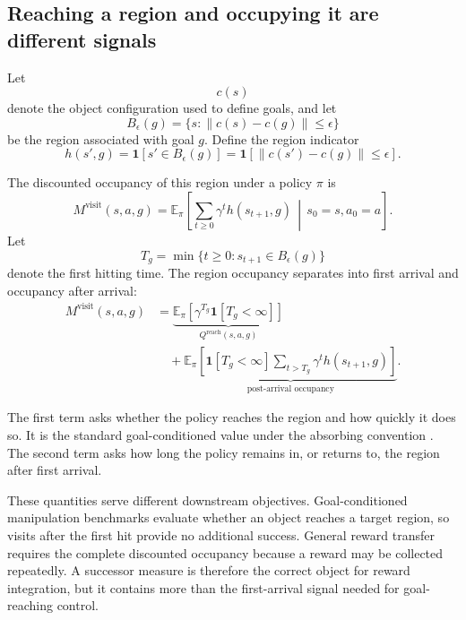 \documentclass{article}
\newcommand{\E}{\mathbb{E}}
\newcommand{\ind}[1]{\mathbf{1}\!\left[#1\right]}
\newcommand{\cube}{c}
\newcommand{\Reach}{\mathrm{reach}}
\newcommand{\Visit}{\mathrm{visit}}
\begin{document}
\subsection{Reaching a region and occupying it are different signals}
\label{sec:reach-vs-visit}

Let
\begin{equation}
\cube(s)
\end{equation}
denote the object configuration used to define goals, and let
\begin{equation}
B_\epsilon(g)=\{s:\|\cube(s)-\cube(g)\|\le\epsilon\}
\label{eq:goal-region}
\end{equation}
be the region associated with goal $g$.
Define the region indicator
\begin{equation}
h(s',g)=\ind{s'\in B_\epsilon(g)}=\ind{\|\cube(s')-\cube(g)\|\le\epsilon}.
\label{eq:hit}
\end{equation}

The discounted occupancy of this region under a policy $\pi$ is
\begin{equation}
M^{\Visit}(s,a,g)
=
\E_\pi\!\left[
\sum_{t\ge0}\gamma^t h(s_{t+1},g)
\,\middle|\,
s_0=s,a_0=a
\right].
\label{eq:region-occupancy}
\end{equation}
Let
\begin{equation}
T_g=\min\{t\ge0:s_{t+1}\in B_\epsilon(g)\}
\end{equation}
denote the first hitting time.
The region occupancy separates into first arrival and occupancy after arrival:
\begin{align}
M^{\Visit}(s,a,g)
&=
\underbrace{
\E_\pi\!\left[\gamma^{T_g}\ind{T_g<\infty}\right]
}_{Q^{\Reach}(s,a,g)}
\nonumber\\
&\quad+
\underbrace{
\E_\pi\!\left[
\ind{T_g<\infty}
\sum_{t>T_g}\gamma^t h(s_{t+1},g)
\right]
}_{\text{post-arrival occupancy}}.
\label{eq:occupancy-decomposition}
\end{align}

The first term asks whether the policy reaches the region and how quickly it does so.
It is the standard goal-conditioned value under the absorbing convention \citep{kaelbling1993learning,andrychowicz2017hindsight}.
The second term asks how long the policy remains in, or returns to, the region after first arrival.

These quantities serve different downstream objectives.
Goal-conditioned manipulation benchmarks evaluate whether an object reaches a target region, so visits after the first hit provide no additional success.
General reward transfer requires the complete discounted occupancy because a reward may be collected repeatedly.
A successor measure is therefore the correct object for reward integration, but it contains more than the first-arrival signal needed for goal-reaching control.
\end{document}
